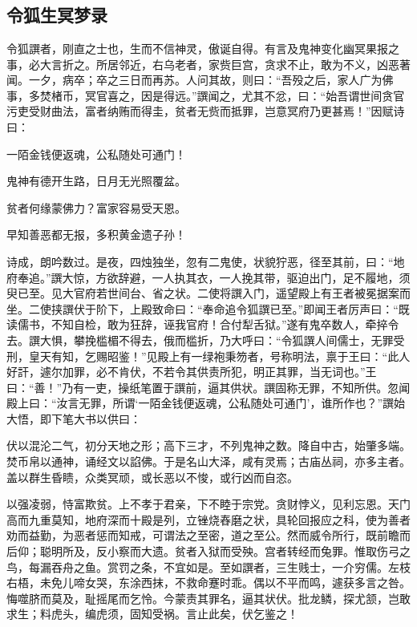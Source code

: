\documentclass[a4paper,12pt,UTF8,twoside]{ctexbook}
\begin{document}
\part{}

\chapter{令狐生冥梦录}

令狐譔者，刚直之士也，生而不信神灵，傲诞自得。有言及鬼神变化幽冥果报之事，必大言折之。所居邻近，右乌老者，家赀巨宫，贪求不止，敢为不义，凶恶著闻。一夕，病卒；卒之三日而再苏。人问其故，则曰：“吾殁之后，家人广为佛事，多焚楮币，冥官喜之，因是得远。”譔闻之，尤其不忿，曰：“始吾谓世间贪官污吏受财曲法，富者纳贿而得圭，贫者无赀而抵罪，岂意冥府乃更甚焉！”因赋诗曰：

一陌金钱便返魂，公私随处可通门！

鬼神有德开生路，日月无光照覆盆。

贫者何缘蒙佛力？富家容易受天恩。

早知善恶都无报，多积黄金遗子孙！

诗成，朗吟数过。是夜，四烛独坐，忽有二鬼使，状貌狞恶，径至其前，曰：“地府奉追。”譔大惊，方欲辞避，一人执其衣，一人挽其带，驱迫出门，足不履地，须臾已至。见大官府若世间台、省之状。二使将譔入门，遥望殿上有王者被冕据案而坐。二使挟譔伏于阶下，上殿致命曰：“奉命追令狐譔已至。”即闻王者厉声曰：“既读儒书，不知自检，敢为狂辞，诬我官府！合付犁舌狱。”遂有鬼卒数人，牵捽令去。譔大惧，攀挽槛楣不得去，俄而槛折，乃大呼曰：“令狐譔人间儒士，无罪受刑，皇天有知，乞赐昭鉴！”见殿上有一绿袍秉笏者，号称明法，禀于王曰：“此人好訐，遽尔加罪，必不肯伏，不若令其供责所犯，明正其罪，当无词也。”王曰：“善！”乃有一吏，操纸笔置于譔前，逼其供状。譔固称无罪，不知所供。忽闻殿上曰：“汝言无罪，所谓‘一陌金钱便返魂，公私随处可通门’，谁所作也？”譔始大悟，即下笔大书以供曰：

伏以混沦二气，初分天地之形；高下三才，不列鬼神之数。降自中古，始肇多端。焚币帛以通神，诵经文以諂佛。于是名山大泽，咸有灵焉；古庙丛祠，亦多主者。盖以群生昏瞆，众类冥顽，或长恶以不悛，或行凶而自恣。

以强凌弱，恃富欺贫。上不孝于君亲，下不睦于宗党。贪财悖义，见利忘恩。天门高而九重莫知，地府深而十殿是列，立锉烧舂磨之状，具轮回报应之科，使为善者劝而益勤，为恶者惩而知戒，可谓法之至密，道之至公。然而威令所行，既前瞻而后仰；聪明所及，反小察而大遗。贫者入狱而受殃。宫者转经而兔罪。惟取伤弓之鸟，每漏吞舟之鱼。赏罚之条，不宜如是。至如譔者，三生贱士，一介穷儒。左枝右梧，未免儿啼女哭，东涂西抹，不救命蹇时乖。偶以不平而鸣，遽获多言之咎。悔噬脐而莫及，耻摇尾而乞怜。今蒙责其罪名，逼其状伏。批龙鳞，探尤颔，岂敢求生；料虎头，编虎须，固知受祸。言止此矣，伏乞鉴之！
\end{document}
